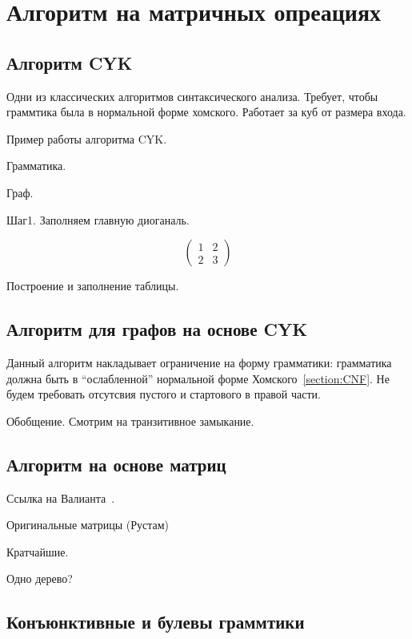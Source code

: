 \section{Алгоритм на матричных опреациях}

\subsection{Алгоритм CYK}

Одни из классических алгоритмов синтаксического анализа.
Требует, чтобы граммтика была в нормальной форме хомского.
Работает за куб от размера входа.

\begin{example}
  Пример работы алгоритма CYK.

  Грамматика.

  Граф.

  Шаг1. Заполняем главную диоганаль.

  $$
  \begin{pmatrix}
    1 & 2 \\
    2 & 3
  \end{pmatrix}
  $$

\end{example}

Построение и заполнение таблицы.

\subsection{Алгоритм для графов на основе CYK}

Данный алгоритм накладывает ограничение на форму грамматики: грамматика должна быть в ``ослабленной'' нормальной форме Хомского~\ref{section:CNF}.
Не будем требовать отсутсвия пустого и стартового в правой части.

Обобщение.
Смотрим на транзитивное замыкание.

\subsection{Алгоритм на основе матриц}

Ссылка на Валианта~\cite{!!!}.

Оригинальные матрицы (Рустам)~\cite{Azimov:2018:CPQ:3210259.3210264}

Кратчайшие.

Одно дерево?

\subsection{Конъюнктивные и булевы граммтики}

